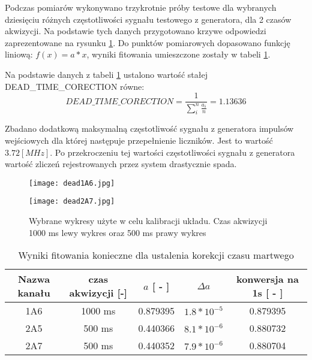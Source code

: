 Podczas pomiarów wykonywano trzykrotnie próby testowe dla wybranych dziesięciu różnych częstotliwości sygnału testowego z generatora, dla 2 czasów akwizycji. Na podstawie tych danych przygotowano krzywe odpowiedzi zaprezentowane na rysunku \ref{wykresy fit calib}. Do punktów pomiarowych dopasowano funkcję liniową: $f(x) = a*x$, wyniki fitowania umieszczone zostały w tabeli \ref{dead time fit}.

Na podstawie danych z tabeli \ref{dead time fit} ustalono wartość stałej DEAD\_TIME\_CORECTION równe:
\begin{equation}
        \label{dead time eq}
        DEAD\_TIME\_CORECTION = \frac{1}{\sum^n_i \frac{a_i}{n}} = 1.13636
\end{equation} 


Zbadano dodatkową maksymalną częstotliwość sygnału z generatora impulsów wejściowych dla której następuje przepełnienie liczników. Jest to wartość $3.72 [MHz]$. Po przekroczeniu tej wartości częstotliwości sygnału z  generatora wartość zliczeń rejestrowanych przez system drastycznie spada. 

\begin{figure}[h]
        \centering
        \begin{multicols}{2}
                \texttt{[image: dead1A6.jpg]} \par
                \texttt{[image: dead2A7.jpg]} \par
        \end{multicols}
        \caption{Wybrane wykresy użyte w celu kalibracji układu. Czas akwizycji 1000 ms lewy wykres oraz 500 ms prawy wykres}
        \label{wykresy fit calib}
\end{figure}

\begin{table}[h]
        \caption{Wyniki fitowania konieczne dla ustalenia korekcji czasu martwego}
        \label{dead time fit}
        \centering
        \begin{tabular}{|c|c|c|c|c|}
                \hline
                Nazwa kanału & czas akwizycji [-] & $a$ [ - ]& $\Delta a$ & konwersja na 1s [ - ] \\ \hline
                1A6 & 1000 ms & 0.879395 & $1.8 * 10^{-5}$ & 0.879395 \\ \hline
                2A5 & 500 ms & 0.440366 & $8.1 * 10^{-6}$ & 0.880732 \\ \hline
                2A7 & 500 ms & 0.440352 & $7.9 * 10^{-6}$ & 0.880704 \\ \hline
        \end{tabular}
\end{table}

